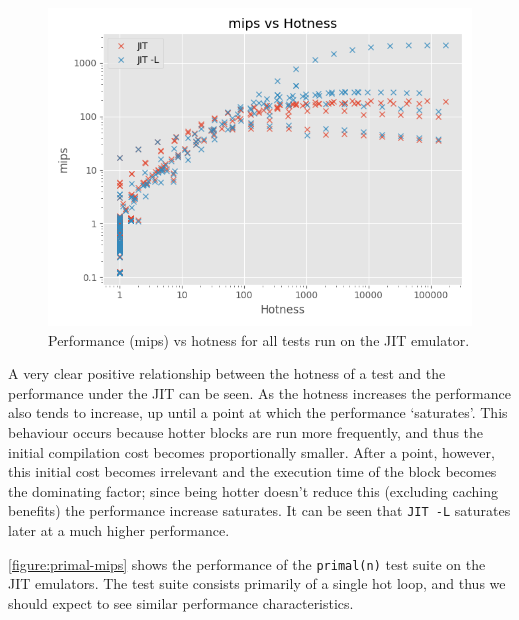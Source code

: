 \begin{figure}[H]
    \centering
    \includegraphics[scale=0.75]{output/graphs/scatter/jit/hotness.png}
    \caption{Performance (mips) vs hotness for all tests run on the JIT emulator.}
    \label{figure:jit-hotness}
\end{figure}

A very clear positive relationship between the hotness of a test and the performance under the JIT can be seen. As the hotness increases the performance also tends to increase, up until a point at which the performance `saturates'. This behaviour occurs because hotter blocks are run more frequently, and thus the initial compilation cost becomes proportionally smaller. After a point, however, this initial cost becomes irrelevant and the execution time of the block becomes the dominating factor; since being hotter doesn't reduce this (excluding caching benefits) the performance increase saturates. It can be seen that \texttt{JIT -L} saturates later at a much higher performance.

\autoref{figure:primal-mips} shows the performance of the \texttt{primal(n)} test suite on the JIT emulators. The test suite consists primarily of a single hot loop, and thus we should expect to see similar performance characteristics.

